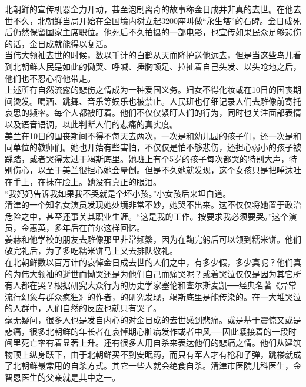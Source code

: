 北朝鲜的宣传机器全力开动，甚至泡制离奇的故事称金日成并非真的去世。在他去世不久，北朝鲜当局开始在全国境内树立起3200座叫做“永生塔”的石碑。金日成死后仍然保留国家主席职位。他死后不久拍摄的一部电影，也宣传如果民众足够悲伤的话，金日成就能得以复活。\\

当伟大领袖去世的时候，数以千计的白鹤从天而降护送他远去，但是当这些鸟儿看到北朝鲜人民是如此的恸哭、呼喊、捶胸顿足、拉扯着自己头发、以头呛地之后，他们也不忍心将他带走。\\

上述所有自然流露的悲伤之情成为一种爱国义务。妇女不得化妆或在10日的国丧期间烫发。喝酒、跳舞、音乐等娱乐也被禁止。人民班也仔细记录人们去雕像前寄托哀思的频率。每个人都被盯着。他们不仅仅紧盯人们的行为，同时也关注面部表情以及语音语调，以此判断人们的悲痛的真实度。\\

美兰在10日的国丧期间不得不每天去两次，一次是和幼儿园的孩子们，还一次是和同单位的教师们。她也开始有些害怕，不仅仅是怕不够悲伤，还担心弱小的孩子被踩踏，或者哭得太过于竭斯底里。她班上有个5岁的孩子每次都哭的特别大声，特别伤心，以至于美兰很担心她会晕倒。但是不久她就发现，这个女孩只是把唾沫吐在手上，在抹在脸上。她没有真正的眼泪。\\

“我妈妈告诉我如果我不哭就是个坏小孩。”小女孩后来坦白道。\\

清津的一个知名女演员发现她处境非常不妙，她哭不出来。这不仅仅将她置于政治危险之中，甚至还事关其职业生涯。“这是我的工作。按要求我必须要哭。”这个演员，金惠英，多年后在首尔这样回忆。\\

姜赫和他学校的朋友去雕像那里非常频繁，因为在鞠完躬后可以领到糯米饼。他们敬完礼后，为了多吃糯米饼马上又去排队敬礼。\\

在北朝鲜数以百万计的哀悼金日成去世的人们之中，有多少假，多少真呢？他们真的为伟大领袖的逝世而恸哭还是为他们自己而痛哭呢？或着哭泣仅仅是因为其它所有人都在哭？根据研究大众行为的历史学家塞伦和查尔斯麦凯──经典名著《异常流行幻象与群众疯狂》的作者，的研究发现，竭斯底里是能传染的。在一大堆哭泣的人群中，人们自然的反应也就只有哭了。\\

毫无疑问，很多人也是发自内心的对金日成的去世感到悲痛。或是基于震惊又或是悲痛，很多北朝鲜的年长者在哀悼期心脏病发作或者中风──因此紧接着的一段时间里死亡率有着显著上升。还有很多人用自杀来表达他们的悲痛之情。他们从建筑物顶上纵身跃下，由于北朝鲜买不到安眠药，而只有军人才有枪和子弹，跳楼就成了北朝鲜最常用的自杀方式。其它一些人就会绝食自杀。清津市医院儿科医生，金智恩医生的父亲就是其中之一。\\
